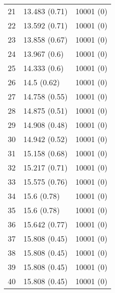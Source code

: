 \begin{table}
\begin{tabularx}{\columnwidth}{lll}
        21        & 13.483 (0.71) & 10001 (0)          \\
        22        & 13.592 (0.71) & 10001 (0)          \\
        23        & 13.858 (0.67) & 10001 (0)          \\
        24        & 13.967 (0.6)  & 10001 (0)          \\
        25        & 14.333 (0.6)  & 10001 (0)          \\
        26        & 14.5 (0.62)   & 10001 (0)          \\
        27        & 14.758 (0.55) & 10001 (0)          \\
        28        & 14.875 (0.51) & 10001 (0)          \\
        29        & 14.908 (0.48) & 10001 (0)          \\
        30        & 14.942 (0.52) & 10001 (0)          \\
        31        & 15.158 (0.68) & 10001 (0)          \\
        32        & 15.217 (0.71) & 10001 (0)          \\
        33        & 15.575 (0.76) & 10001 (0)          \\
        34        & 15.6 (0.78)   & 10001 (0)          \\
        35        & 15.6 (0.78)   & 10001 (0)          \\
        36        & 15.642 (0.77) & 10001 (0)          \\
        37        & 15.808 (0.45) & 10001 (0)          \\
        38        & 15.808 (0.45) & 10001 (0)          \\
        39        & 15.808 (0.45) & 10001 (0)          \\
        40        & 15.808 (0.45) & 10001 (0)          \\
        \bottomrule
    \end{tabularx}
\end{table}